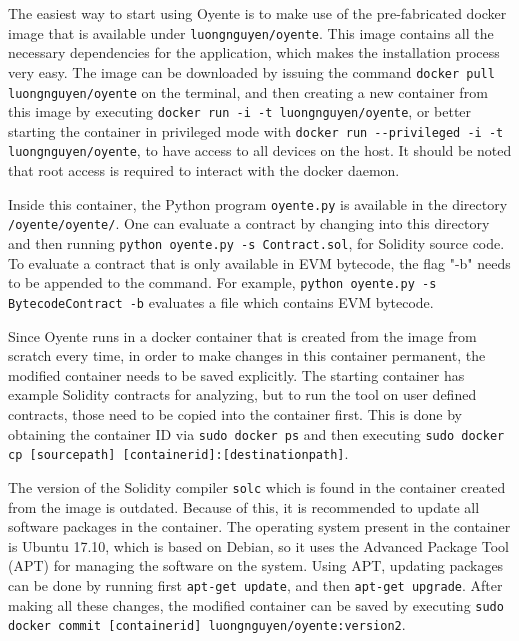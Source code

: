 The easiest way to start using Oyente is to make use of the pre-fabricated docker image that is available under \texttt{luongnguyen/oyente}. This image contains all the necessary dependencies for the application, which makes the installation process very easy. The image can be downloaded by issuing the command \texttt{docker pull luongnguyen/oyente} on the terminal, and then creating a new container from this image by executing \texttt{docker run -i -t luongnguyen/oyente}, or better starting the container in privileged mode with \texttt{docker run -{}-privileged -i -t luongnguyen/oyente}, to have access to all devices on the host. It should be noted that root access is required to interact with the docker daemon.

Inside this container, the Python program \texttt{oyente.py} is available in the directory \texttt{/oyente/oyente/}. One can evaluate a contract by changing into this directory and then running \texttt{python oyente.py -s Contract.sol}, for Solidity source code. To evaluate a contract that is only available in EVM bytecode, the flag "-b" needs to be appended to the command. For example, \texttt{python oyente.py -s BytecodeContract -b} evaluates a file which contains EVM bytecode.

Since Oyente runs in a docker container that is created from the image from scratch every time, in order to make changes in this container permanent, the modified container needs to be saved explicitly. The starting container has example Solidity contracts for analyzing, but to run the tool on user defined contracts, those need to be copied into the container first. This is done by obtaining the container ID via \texttt{sudo docker ps} and then executing \texttt{sudo docker cp [source\textunderscore path] [container\textunderscore id]:[destination\textunderscore path]}.

The version of the Solidity compiler \texttt{solc} which is found in the container created from the image is outdated. Because of this, it is recommended to update all software packages in the container. The operating system present in the container is Ubuntu 17.10, which is based on Debian, so it uses the Advanced Package Tool (APT) for managing the software on the system. Using APT, updating packages can be done by running first \texttt{apt-get update}, and then \texttt{apt-get upgrade}. After making all these changes, the modified container can be saved by executing \texttt{sudo docker commit [container\textunderscore id] luongnguyen/oyente:version2}.

